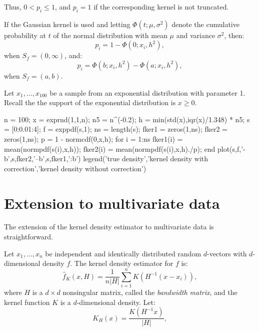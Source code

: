 Thus, $0<p_i\leq 1$, and $p_i  = 1$ if the corresponding kernel is not truncated.

If the Gaussian kernel is used and letting $\Phi(t;\mu,\sigma^2)$ denote the cumulative probability at $t$ of the normal distribution with mean $\mu$ and variance $\sigma^2$, then:
\begin{equation}
p_i=1-\Phi(0;x_i,h^2),
\end{equation}
when $S_f=(0,\infty)$, and:
\begin{equation}
p_i=\Phi(b;x_i,h^2)-\Phi(a;x_i,h^2),
\end{equation}
when $S_f=(a,b)$.

\begin{labwork}
Let $x_1,\ldots,x_{100}$ be a sample from an exponential distribution with parameter 1. Recall the the support of the exponential distribution is $x \geq 0$.
\begin{VrbM}
n = 100;
x = exprnd(1,1,n); %
n5 = n^(-0.2);
h = min(std(x),iqr(x)/1.348) * n5; %
s = [0:0.01:4]; %
f = exppdf(s,1); %
ns = length(s); %
fker1 = zeros(1,ns); %
fker2 = zeros(1,ns); %
p = 1 - normcdf(0,x,h); %
for i = 1:ns
    fker1(i) = mean(normpdf(s(i),x,h)); %
    fker2(i) = mean(normpdf(s(i),x,h)./p); %
end
plot(s,f,'-b',s,fker2,'--b',s,fker1,':b')
legend('true density','kernel density with correction','kernel density without correction')
\end{VrbM}
\end{labwork}

\section{Extension to multivariate data}
The extension of the kernel density estimator to multivariate data is straightforward.

Let $x_1,\ldots,x_n$ be independent and identically distributed random $d$-vectors with $d$-dimensional density $f$. The kernel density estimator for $f$ is:
\begin{equation}
\hat{f}_K(x,H)=\frac{1}{n|H|}\sum^n_{i=1}K(H^{-1}(x-x_i)),
\end{equation}
where $H$ is a $d \times d$ nonsingular matrix, called the {\it bandwidth matrix}, and the kernel function $K$ is a $d$-dimensional density. Let:
\begin{equation}
K_H(x)=\frac{K(H^{-1}x)}{|H|},
\end{equation}

